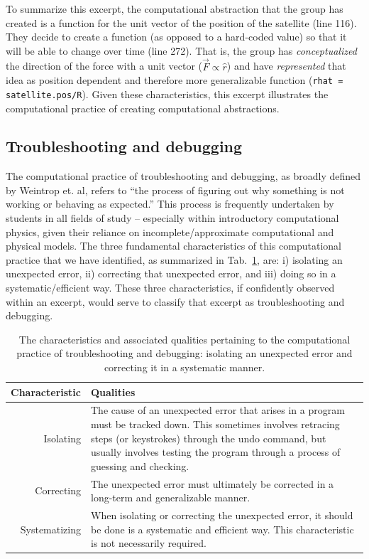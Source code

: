 \documentclass{msuphddissertation}
\begin{document}
\begin{doublespace}
To summarize this excerpt, the computational abstraction that the group has created is a function for the unit vector of the position of the satellite (line 116).  They decide to create a function (as opposed to a hard-coded value) so that it will be able to change over time (line 272).  That is, the group has \textit{conceptualized} the direction of the force with a unit vector ($\vec{F}\propto\hat{r}$) and have \textit{represented} that idea as position dependent and therefore more generalizable function (\texttt{rhat = satellite.pos/R}).  Given these characteristics, this excerpt illustrates the computational practice of creating computational abstractions.

\subsection{Troubleshooting and debugging}\label{CH5:SecTroubleshootingAndDebugging}

The computational practice of troubleshooting and debugging, as broadly defined by Weintrop et. al, refers to ``the process of figuring out why something is not working or behaving as expected.''  This process is frequently undertaken by students in all fields of study -- especially within introductory computational physics, given their reliance on incomplete/approximate computational and physical models.  The three fundamental characteristics of this computational practice that we have identified, as summarized in Tab.~\ref{CH5:TroubleshootingAndDebugging}, are: i) isolating an unexpected error, ii) correcting that unexpected error, and iii) doing so in a systematic/efficient way.  These three characteristics, if confidently observed within an excerpt, would serve to classify that excerpt as troubleshooting and debugging.

\begin{table}
\begin{tabular}{r|p{}}
Characteristic & Qualities \\\hline\hline
Isolating & The cause of an unexpected error that arises in a program must be tracked down.  This sometimes involves retracing steps (or keystrokes) through the undo command, but usually involves testing the program through a process of guessing and checking.\\
Correcting & The unexpected error must ultimately be corrected in a long-term and generalizable manner.\\
Systematizing & When isolating or correcting the unexpected error, it should be done is a systematic and efficient way.  This characteristic is not necessarily required.\\
\end{tabular}\caption{The characteristics and associated qualities pertaining to the computational practice of troubleshooting and debugging: isolating an unexpected error and correcting it in a systematic manner.}\label{CH5:TroubleshootingAndDebugging}
\end{table}


\end{doublespace}
\end{document}
